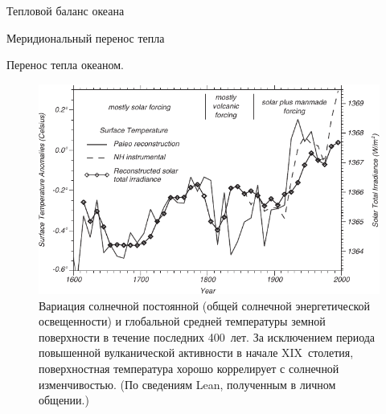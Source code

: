 \begin{chapter}{Тепловой баланс океана}
\begin{section}{Меридиональный перенос тепла}
\begin{paragraph}{Перенос тепла океаном.}
\begin{figure}[t!]
\includegraphics{pics/solarinfluence}
\caption{Вариация солнечной постоянной (общей солнечной энергетической 
освещенности) и глобальной средней температуры земной поверхности в течение
последних 400~лет. За исключением периода повышенной вулканической активности
в начале XIX~столетия, поверхностная температура хорошо коррелирует с солнечной
изменчивостью. (По сведениям Lean, полученным в личном общении.)}
\label{fig:solarinfluence}
\end{figure}
%


\end{paragraph}
\end{section}
\end{chapter}
